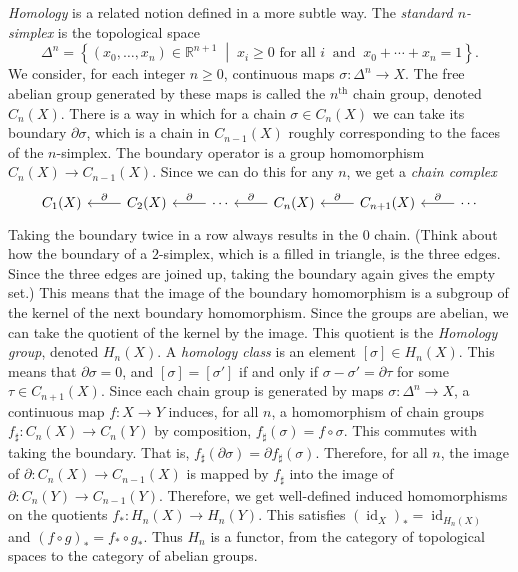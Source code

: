 \documentclass[a4paper,11pt]{article}
\begin{document}
      \textit{Homology} is a related notion defined in a more subtle way. The \emph{standard \(n\)-simplex} is the topological space
      \[
        \Delta^n = \left\{ \left(x_0, \dots, x_n\right) \in \mathbb{R}^{n+1} \; \middle| \; x_i \ge 0\text{ for all }i\ \text{ and }\ x_0 + \cdots + x_n = 1 \right\}.
      \]
      We consider, for each integer \(n \ge 0\), continuous maps \(\sigma: \Delta^n \to X\). The free abelian group generated by these maps is called the \(n^\text{th}\) chain group, denoted \(C_n(X)\). There is a way in which for a chain \(\sigma \in C_n(X)\) we can take its boundary \(\partial \sigma\), which is a chain in \(C_{n-1}(X)\) roughly corresponding to the faces of the \(n\)-simplex. The boundary operator is a group homomorphism \(C_n(X) \to C_{n-1}(X)\). Since we can do this for any \(n\), we get a \textit{chain complex}
      \[
        \begin{tikzcd}
          C_1(X) & C_2(X) \arrow[l,"\partial"'] & \cdots \arrow[l,"\partial"'] & C_n(X) \arrow[l,"\partial"'] & C_{n+1}(X) \arrow[l,"\partial"'] & \cdots \arrow[l,"\partial"']
        \end{tikzcd}
      \]
      Taking the boundary twice in a row always results in the \(0\) chain. (Think about how the boundary of a \(2\)-simplex, which is a filled in triangle, is the three edges. Since the three edges are joined up, taking the boundary again gives the empty set.) This means that the image of the boundary homomorphism is a subgroup of the kernel of the next boundary homomorphism. Since the groups are abelian, we can take the quotient of the kernel by the image. This quotient is the \textit{Homology group}, denoted \(H_n(X)\). A \textit{homology class} is an element \([\sigma] \in H_n(X)\). This means that \(\partial \sigma = 0\), and \([\sigma] = [\sigma']\) if and only if \(\sigma - \sigma' = \partial \tau\) for some \(\tau \in C_{n+1}(X)\). Since each chain group is generated by maps \(\sigma: \Delta^n \to X\), a continuous map \(f: X \to Y\) induces, for all \(n\), a homomorphism of chain groups \(f_\sharp: C_n(X) \to C_n(Y)\) by composition, \(f_\sharp(\sigma) = f \circ \sigma\). This commutes with taking the boundary. That is, \(f_\sharp(\partial \sigma) = \partial f_\sharp(\sigma)\). Therefore, for all \(n\), the image of \(\partial: C_n(X) \to C_{n-1}(X)\) is mapped by \(f_\sharp\) into the image of \(\partial: C_n(Y) \to C_{n-1}(Y)\). Therefore, we get well-defined induced homomorphisms on the quotients \(f_*: H_n(X) \to H_n(Y)\). This satisfies \((\operatorname{id}_X)_* = \operatorname{id}_{H_n(X)}\) and \((f \circ g)_* = f_* \circ g_*\). Thus \(H_n\) is a functor, from the category of topological spaces to the category of abelian groups.
\end{document}
